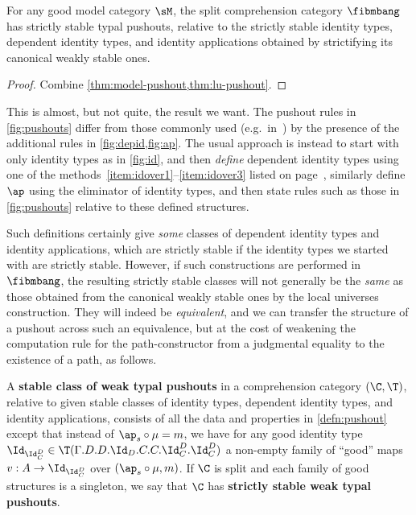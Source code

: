 \begin{thm}
  For any good model category $\sM$, the split comprehension category $\fibmbang$ has strictly stable typal pushouts, relative to the strictly stable identity types, dependent identity types, and identity applications obtained by strictifying its canonical weakly stable ones.
\end{thm}
\begin{proof}
  Combine \cref{thm:model-pushout,thm:lu-pushout}.
\end{proof}

This is almost, but not quite, the result we want.
The pushout rules in \cref{fig:pushouts} differ from those commonly used (e.g.\ in~\cite{hottbook}) by the presence of the additional rules in \cref{fig:depid,fig:ap}.
The usual approach is instead to start with only identity types as in \cref{fig:id}, and then \emph{define} dependent identity types using one of the methods~\ref{item:idover1}--\ref{item:idover3} listed on page~\pageref{idover}, similarly define $\ap$ using the eliminator of identity types, and then state rules such as those in \ref{fig:pushouts} relative to these defined structures.

Such definitions certainly give \emph{some} classes of dependent identity types and identity applications, which are strictly stable if the identity types we started with are strictly stable.
However, if such constructions are performed in $\fibmbang$, the resulting strictly stable classes will not generally be the \emph{same} as those obtained from the canonical weakly stable ones by the local universes construction.
They will indeed be \emph{equivalent}, and we can transfer the structure of a pushout across such an equivalence, but at the cost of weakening the computation rule for the path-constructor from a judgmental equality to the existence of a path, as follows.

\begin{defn}\label{defn:wk-pushouts}
  A \textbf{stable class of weak typal pushouts} in a comprehension category $(\C,\T)$, relative to given stable classes of identity types, dependent identity types, and identity applications, consists of all the data and properties in \cref{defn:pushout} except that instead of $\ap_s\circ \mu = m$, we have for any good identity type $\Id_{\Id^D_C}\in\T(\Gamma.D.D.\Id_D.C.C.\Id^D_C.\Id^D_C)$ a non-empty family of ``good'' maps $v:A\to \Id_{\Id^D_C}$ over $(\ap_s\circ \mu, m)$.
  If $\C$ is split and each family of good structures is a singleton, we say that $\C$ has \textbf{strictly stable weak typal pushouts}.
\end{defn}


